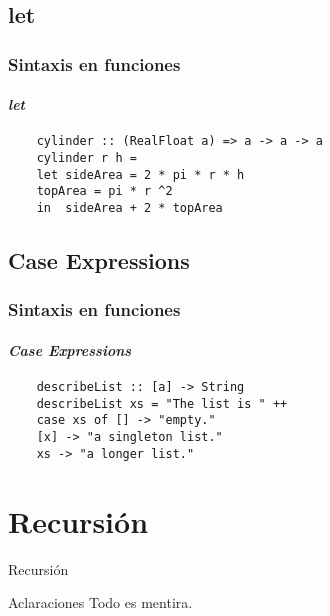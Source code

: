 \documentclass{beamer}
\begin{document}
\subsection{let}
\begin{frame}[fragile]
  \frametitle{Sintaxis en funciones}
  \framesubtitle{\emph{let}}
  \begin{verbatim}
    cylinder :: (RealFloat a) => a -> a -> a
    cylinder r h =
    let sideArea = 2 * pi * r * h
    topArea = pi * r ^2
    in  sideArea + 2 * topArea
  \end{verbatim}
\end{frame}
\subsection{Case Expressions}
\begin{frame}[fragile]
  \frametitle{Sintaxis en funciones}
  \framesubtitle{\emph{Case Expressions}}
  \begin{verbatim}
    describeList :: [a] -> String
    describeList xs = "The list is " ++
    case xs of [] -> "empty."
    [x] -> "a singleton list."
    xs -> "a longer list."
  \end{verbatim}
\end{frame}
\section{Recursión}
\begin{frame}{Recursión}      %

\end{frame}
\begin{frame}{Aclaraciones}
  Todo es mentira.
\end{frame}
\end{document}
